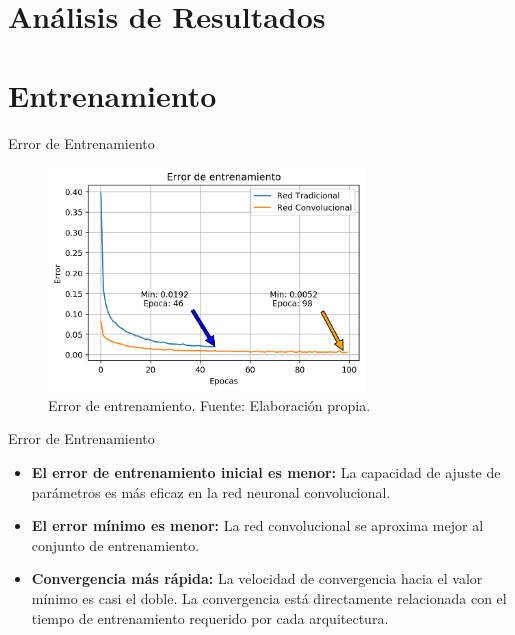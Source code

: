 \documentclass[10pt]{beamer}
\begin{document}
\section{Análisis de Resultados}

\section*{Entrenamiento}

\begin{frame}{Error de Entrenamiento}
    \begin{figure}[!ht] 
        \centering
        \includegraphics[width=0.75\textwidth]{../img/trainloss}
        \caption[Error de entrenamiento]{Error de entrenamiento. Fuente: Elaboración propia. }
        \label{fig:trainloss}
    \end{figure}
    
\end{frame}

\begin{frame}{Error de Entrenamiento}
    \begin{itemize}
        \item \textbf{El error de entrenamiento inicial es menor:} La capacidad de ajuste de parámetros 
        es más eficaz en la red neuronal convolucional.
        \item \textbf{El error mínimo es menor:} La red convolucional se aproxima mejor al conjunto de 
        entrenamiento.
        \item \textbf{Convergencia más rápida:} La velocidad de convergencia hacia el valor mínimo es casi el doble. La convergencia está directamente 
        relacionada con el tiempo de entrenamiento requerido por cada arquitectura.
    \end{itemize}
    
\end{frame}
\end{document}
